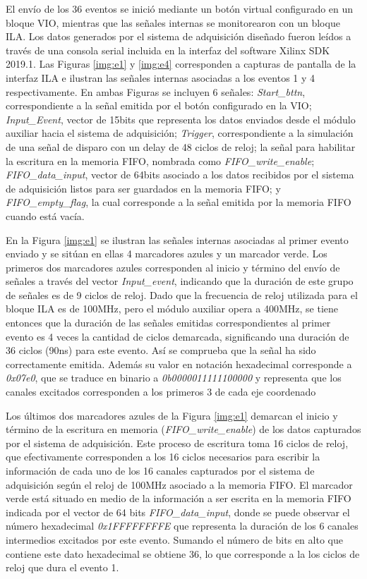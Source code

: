 	El envío de los 36 eventos se inició mediante un botón virtual configurado en un bloque VIO, mientras que las señales internas se monitorearon con un bloque ILA. Los datos generados por el sistema de adquisición diseñado fueron leídos a través de una consola serial incluida en la interfaz del software Xilinx SDK 2019.1. Las Figuras \ref{img:e1} y \ref{img:e4} corresponden a capturas de pantalla de la interfaz ILA e ilustran las señales internas asociadas a los eventos 1 y 4 respectivamente. En ambas Figuras se incluyen 6 señales: \textit{Start\_bttn}, correspondiente a la señal emitida por el botón configurado en la VIO; \textit{Input\_Event}, vector de 15bits que representa los datos enviados desde el módulo auxiliar hacia el sistema de adquisición; \textit{Trigger}, correspondiente a la simulación de una señal de disparo con un delay de 48 ciclos de reloj; la señal para habilitar la escritura en la memoria FIFO, nombrada como \textit{FIFO\_write\_enable}; \textit{FIFO\_data\_input}, vector de 64bits asociado a los datos recibidos por el sistema de adquisición listos para ser guardados en la memoria FIFO; y \textit{FIFO\_empty\_flag}, la cual corresponde a la señal emitida por la memoria FIFO cuando está vacía.
	
	En la Figura \ref{img:e1} se ilustran las señales internas asociadas al primer evento enviado y se sitúan en ellas 4 marcadores azules y un marcador verde. Los primeros dos marcadores azules corresponden al inicio y término del envío de señales a través del vector \textit{Input\_event}, indicando que la duración de este grupo de señales es de 9 ciclos de reloj. Dado que la frecuencia de reloj utilizada para el bloque ILA es de 100MHz, pero el módulo auxiliar opera a 400MHz, se tiene entonces que la duración de las señales emitidas correspondientes al primer evento es 4 veces la cantidad de ciclos demarcada, significando una duración de 36 ciclos (90ns) para este evento. Así se comprueba que la señal ha sido correctamente emitida. Además su valor en notación hexadecimal corresponde a \textit{0x07e0}, que se traduce en binario a \textit{0b0000011111100000} y representa que los canales excitados corresponden a los primeros 3 de cada eje coordenado
	
	Los últimos dos marcadores azules de la Figura \ref{img:e1} demarcan el inicio y término de la escritura en memoria (\textit{FIFO\_write\_enable}) de los datos capturados por el sistema de adquisición. Este proceso de escritura toma 16 ciclos de reloj, que efectivamente corresponden a los 16 ciclos necesarios para escribir la información de cada uno de los 16 canales capturados por el sistema de adquisición según el reloj de 100MHz asociado a la memoria FIFO. El marcador verde está situado en medio de la información a ser escrita en la memoria FIFO indicada por el vector de 64 bits \textit{FIFO\_data\_input}, donde se puede observar el número hexadecimal \textit{0x1FFFFFFFFE} que representa la duración de los 6 canales intermedios excitados por este evento. Sumando el número de bits en alto que contiene este dato hexadecimal se obtiene 36, lo que corresponde a la los ciclos de reloj que dura el evento 1.
	
